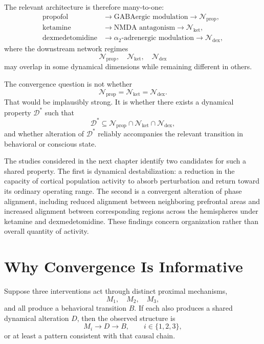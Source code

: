\documentclass[11pt]{book}
\begin{document}
The relevant architecture is therefore many-to-one:
\[
\begin{aligned}
\text{propofol}
&\longrightarrow
\text{GABAergic modulation}
\longrightarrow
\mathcal N_{\mathrm{prop}},
\\
\text{ketamine}
&\longrightarrow
\text{NMDA antagonism}
\longrightarrow
\mathcal N_{\mathrm{ket}},
\\
\text{dexmedetomidine}
&\longrightarrow
\alpha_2\text{-adrenergic modulation}
\longrightarrow
\mathcal N_{\mathrm{dex}},
\end{aligned}
\]
where the downstream network regimes
\[
\mathcal N_{\mathrm{prop}},
\quad
\mathcal N_{\mathrm{ket}},
\quad
\mathcal N_{\mathrm{dex}}
\]
may overlap in some dynamical dimensions while remaining different in others.

The convergence question is not whether
\[
\mathcal N_{\mathrm{prop}}
=
\mathcal N_{\mathrm{ket}}
=
\mathcal N_{\mathrm{dex}}.
\]
That would be implausibly strong. It is whether there exists a dynamical property $\mathcal D^{*}$ such that
\[
\mathcal D^{*}
\subseteq
\mathcal N_{\mathrm{prop}}
\cap
\mathcal N_{\mathrm{ket}}
\cap
\mathcal N_{\mathrm{dex}},
\]
and whether alteration of $\mathcal D^{*}$ reliably accompanies the relevant transition in behavioral or conscious state.

The studies considered in the next chapter identify two candidates for such a shared property. The first is dynamical destabilization: a reduction in the capacity of cortical population activity to absorb perturbation and return toward its ordinary operating range. The second is a convergent alteration of phase alignment, including reduced alignment between neighboring prefrontal areas and increased alignment between corresponding regions across the hemispheres under ketamine and dexmedetomidine. These findings concern organization rather than overall quantity of activity.

\section*{Why Convergence Is Informative}

Suppose three interventions act through distinct proximal mechanisms,
\[
M_1,\quad M_2,\quad M_3,
\]
and all produce a behavioral transition $B$. If each also produces a shared dynamical alteration $D$, then the observed structure is
\[
M_i\longrightarrow D\longrightarrow B,
\qquad
i\in\{1,2,3\},
\]
or at least a pattern consistent with that causal chain.
\end{document}
